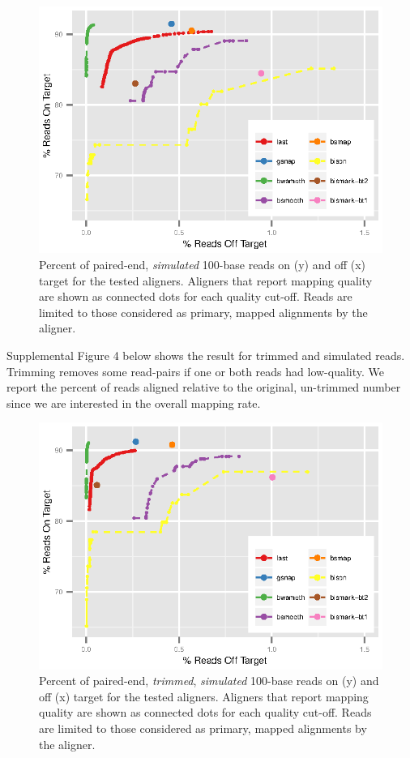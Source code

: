 \documentclass[12pt]{article}
\begin{document}
\begin{figure}[H]%
    \centerline{\includegraphics[width=125mm]{sim-quals.eps}}
    \caption{Percent of paired-end, \emph{simulated} 100-base reads on (y) and off (x) target for the tested aligners. Aligners that report mapping quality are shown as connected dots for each quality cut-off. Reads are limited to those considered as primary, mapped alignments by the aligner.
}\label{suppfig:03}
\end{figure}

Supplemental Figure 4 below shows the result for trimmed and simulated reads.
Trimming removes some read-pairs if one or both reads had low-quality. We
report the percent of reads aligned relative to the original, un-trimmed number
since we are interested in the overall mapping rate.

\begin{figure}[H]%
    \centerline{\includegraphics[width=125mm]{sim-trim-quals.eps}}
    \caption{Percent of paired-end, \emph{trimmed}, \emph{simulated} 100-base reads on (y) and off (x) target for the tested aligners. Aligners that report mapping quality are shown as connected dots for each quality cut-off. Reads are limited to those considered as primary, mapped alignments by the aligner.
}\label{suppfig:04}
\end{figure}
\end{document}
